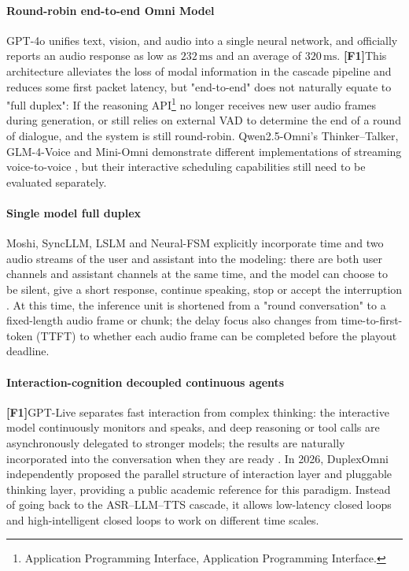 \documentclass[UTF8,fontset=none,a4paper,10pt]{ctexart}
\newcommand{\FOne}{\textcolor{official}{\textbf{[F1]}}}
\newcommand{\ms}{\,\mathrm{ms}}
\begin{document}
\paragraph{Round-robin end-to-end Omni Model}
GPT-4o unifies text, vision, and audio into a single neural network, and officially reports an audio response as low as $232\ms$ and an average of $320\ms$\cite{en:openai2024gpt4osystemcard}. \FOne This architecture alleviates the loss of modal information in the cascade pipeline and reduces some first packet latency, but "end-to-end" does not naturally equate to "full duplex": If the reasoning API\footnote{Application Programming Interface, Application Programming Interface. } no longer receives new user audio frames during generation, or still relies on external VAD to determine the end of a round of dialogue, and the system is still round-robin. Qwen2.5-Omni's Thinker--Talker, GLM-4-Voice and Mini-Omni demonstrate different implementations of streaming voice-to-voice \cite{en:xu2025qwenomni,en:zeng2024glm4voice,en:xie2024miniomni}, but their interactive scheduling capabilities still need to be evaluated separately.

\paragraph{Single model full duplex}
Moshi, SyncLLM, LSLM and Neural-FSM explicitly incorporate time and two audio streams of the user and assistant into the modeling: there are both user channels and assistant channels at the same time, and the model can choose to be silent, give a short response, continue speaking, stop or accept the interruption \cite{en:defossez2024moshi,en:veluri2024syncllm,en:ma2025lslm,en:wang2024neuralfsm}. At this time, the inference unit is shortened from a "round conversation" to a fixed-length audio frame or chunk; the delay focus also changes from time-to-first-token (TTFT) to whether each audio frame can be completed before the playout deadline.

\paragraph{Interaction-cognition decoupled continuous agents}
\FOne GPT-Live separates fast interaction from complex thinking: the interactive model continuously monitors and speaks, and deep reasoning or tool calls are asynchronously delegated to stronger models; the results are naturally incorporated into the conversation when they are ready \cite{en:openai2026gptlive,en:openai2026continuous}. In 2026, DuplexOmni independently proposed the parallel structure \cite{en:huang2026duplexomni} of interaction layer and pluggable thinking layer, providing a public academic reference for this paradigm. Instead of going back to the ASR--LLM--TTS cascade, it allows low-latency closed loops and high-intelligent closed loops to work on different time scales.
\end{document}
